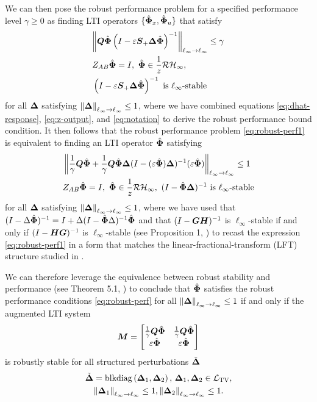We can then pose the robust performance problem for a specified performance level $\gamma \geq 0$ as finding LTI operators $\{\hat{\boldsymbol{\Phi}}_x,\hat{\boldsymbol{\Phi}}_u\}$ that satisfy 
\begin{equation}\label{eq:robust-perf1}
\begin{aligned}
&{ \left\lVert \boldsymbol{Q}\hat{\boldsymbol{\Phi}} \left(I-\varepsilon\boldsymbol{S}_+{\boldsymbol{\Delta}}\hat{\boldsymbol{\Phi}}\right)^{-1}  \right\rVert_{\ell_\infty \to \ell_\infty}} \leq \gamma \\
&Z_{AB}\hat{\boldsymbol{\Phi}} = I,\ \hat{\boldsymbol{\Phi}} \in \frac{1}{z}\mathcal{RH}_\infty, \\
& \left(I-\varepsilon\boldsymbol{S}_+{\boldsymbol{\Delta}}\hat{\boldsymbol{\Phi}}\right)^{-1} \text{ is $\ell_\infty$-stable}
\end{aligned}
\end{equation}
for all ${\boldsymbol{\Delta}}$ satisfying $\left\|{\boldsymbol{\Delta}}\right\|_{\ell_\infty\to\ell_\infty}\leq 1$, where we have combined equations  \eqref{eq:dhat-response}, \eqref{eq:z-output}, and \eqref{eq:notation} to derive the robust performance bound condition.  It then follows that the robust performance problem \eqref{eq:robust-perf1} is equivalent to finding an LTI operator $\hat{\boldsymbol{\Phi}}$ satisfying
\begin{equation} \label{eq:robust-perf}
\begin{aligned}
& \left\|\frac{1}{\gamma}\boldsymbol{Q}\hat{\boldsymbol{\Phi}} + \frac{1}{\gamma}\boldsymbol{Q}\hat{\boldsymbol{\Phi}}{\boldsymbol{\Delta}}(I-(\varepsilon\hat{\boldsymbol{\Phi}}){\boldsymbol{\Delta}})^{-1}(\varepsilon\hat{\boldsymbol{\Phi}})\right\|_{\ell_\infty\to\ell_\infty} \leq 1 \\
& Z_{AB}\hat{\boldsymbol{\Phi}} = I,\ \hat{\boldsymbol{\Phi}} \in \frac{1}{z}\mathcal{RH}_\infty,\   (I-\hat{\boldsymbol{\Phi}}{\boldsymbol{\Delta}})^{-1} \text{ is $\ell_\infty$-stable}\\
\end{aligned}
\end{equation}
for all ${\boldsymbol{\Delta}}$ satisfying $\left\|{\boldsymbol{\Delta}}\right\|_{\ell_\infty\to\ell_\infty}\leq 1$, where we have used that $(I-\Delta\hat{\boldsymbol{\Phi}})^{-1} = I + \Delta(I-\hat{\boldsymbol{\Phi}}\Delta)^{-1}\hat{\boldsymbol{\Phi}}$ and that $(I-\boldsymbol{GH})^{-1}$ is $\ell_\infty$-stable if and only if $(I-\boldsymbol{HG})^{-1}$ is $\ell_\infty$-stable (see Proposition 1, \cite{khammash1990stability}) to recast the expression \eqref{eq:robust-perf1} in a form that matches the linear-fractional-transform (LFT) structure studied in \cite{khammash1990stability,dahleh1994control}.

We can therefore leverage the equivalence between robust stability and performance (see Theorem 5.1, \cite{khammash1990stability}) to conclude that $\hat{\boldsymbol{\Phi}}$ satisfies the robust performance conditions \eqref{eq:robust-perf} for all $\left\|{\boldsymbol{\Delta}}\right\|_{\ell_\infty\to\ell_\infty}\leq 1$ if and only if the augmented LTI system
\begin{equation}
\tf M = \begin{bmatrix} \frac{1}{\gamma}\Q\Phih & \frac{1}{\gamma}\Q\Phih \\ \eps\Phih & \eps\Phih \end{bmatrix}
\label{eq:bigM}
\end{equation}
is robustly stable for all structured perturbations $\tilde{{\boldsymbol{\Delta}}}$ 
\begin{multline}
\tilde{{\boldsymbol{\Delta}}} = \mathrm{blkdiag}\left({\boldsymbol{\Delta}}_1,{\boldsymbol{\Delta}}_2\right), \, {\boldsymbol{\Delta}}_1, {\boldsymbol{\Delta}}_2 \in \mathcal{L}_{\mathrm{TV}}, \\ \left\|{\boldsymbol{\Delta}}_1\right\|_{\ell_\infty\to\ell_\infty} \leq 1, \left\|{\boldsymbol{\Delta}}_2\right\|_{\ell_\infty\to\ell_\infty} \leq 1.
\end{multline}

